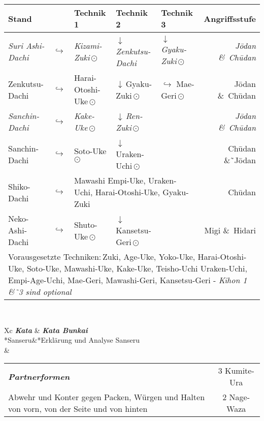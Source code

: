 	\null\vfill\null
	\begin{tabularx}{\textwidth}{llllXr}
		\textbf{Stand} 	&  	& \textbf{Technik 1} & \textbf{Technik 2} 				& \textbf{Technik 3}& \textbf{Angriffsstufe}\\
		\midrule
		\textit{Suri Ashi-Dachi}	& \(\hookrightarrow\)	& \textit{Kizami-Zuki}\,\(\odot\)		& \(\downarrow\)\,\textit{Zenkutsu-Dachi} & \(\downarrow\)	 \textit{Gyaku-Zuki}\,\(\odot\)	& \textit{J\={o}dan \&~Ch\={u}dan} \\
		Zenkutsu-Dachi 	& \(\hookrightarrow\)	& Harai-Otoshi-Uke\,\(\odot\) 	& \(\downarrow\)\,Gyaku-Zuki\,\(\odot\)	& \(\hookrightarrow\) 	 Mae-Geri\,\(\odot\)	& J\={o}dan \&~Ch\={u}dan \\
		\textit{Sanchin-Dachi }	& \(\hookrightarrow\)	& \textit{Kake-Uke}\,\(\odot\) 			& \(\downarrow\)\,\textit{Ren-Zuki}\,\(\odot\) &				& \textit{J\={o}dan \&~Ch\={u}dan} \\
		Sanchin-Dachi 	& \(\hookrightarrow\)	& Soto-Uke\,\(\odot\) 			& \(\downarrow\)\,Uraken-Uchi\,\(\odot\) 				&						&	 					 Ch\={u}dan \&˜J\={o}dan\\
		Shiko-Dachi 	& \(\hookrightarrow\)	&\multicolumn{3}{l}{Mawashi Empi-Uke, Uraken-Uchi, Harai-Otoshi-Uke, Gyaku-Zuki}	&	 					 Ch\={u}dan \\
		Neko-Ashi-Dachi	& \(\hookrightarrow\)	& Shuto-Uke\,\(\odot\) 			& \(\downarrow\)\,Kansetsu-Geri\,\(\odot\) 					&						& 						 Migi \&~Hidari  \\
		\midrule
		\multicolumn{6}{p{\linewidth-2\tabcolsep}}{{\footnotesize Vorausgesetzte Techniken:\,Zuki, Age-Uke, Yoko-Uke, Harai-Otoshi-Uke, Soto-Uke, Mawashi-Uke, Kake-Uke, Teisho-Uchi Uraken-Uchi, Empi-Age-Uchi, Mae-Geri, Mawashi-Geri, Kansetsu-Geri - \textit{Kihon 1 \&˜3 sind optional}}}\\
		\midrule
	\end{tabularx}\\
	\null\vfill\null
	\begin{minipage}[t]{0.48\textwidth}
		\begin{tabularx}{\textwidth}{Xc}
			\textbf{\textit{Kata}} & \textbf{\textit{Kata Bunkai}} \\
			*{Sanseru}&*{Erklärung und Analyse Sanseru}\\
			& \\
		\end{tabularx}
	\end{minipage}
	\null\hfill\null
	\begin{minipage}[t]{0.48\textwidth}
		\begin{tabularx}{\textwidth}{Xc}
			{\textbf{\textit{Partnerformen}}} & 3 Kumite-Ura\\
			Abwehr und Konter gegen Packen, Würgen und Halten von vorn, von
			der Seite und von hinten & 2 Nage-Waza  \\
		\end{tabularx}
	\end{minipage}\\
